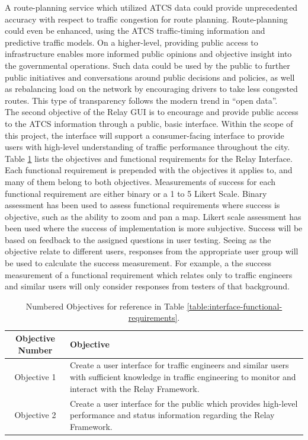 \documentclass{article}
\begin{document}
A route-planning service which utilized ATCS data could provide unprecedented accuracy with respect to traffic congestion for route planning.
Route-planning could even be enhanced, using the ATCS traffic-timing information and predictive traffic models.
On a higher-level, providing public access to infrastructure enables more informed public opinions and objective insight into the governmental operations.
Such data could be used by the public to further public initiatives and conversations around public decisions and policies, as well as rebalancing load on the network by encouraging drivers to take less congested routes.
This type of transparency follows the modern trend in ``open data''.\\

The second objective of the Relay GUI is to encourage and provide public access to the ATCS information through a public, basic interface.
Within the scope of this project, the interface will support a consumer-facing interface to provide users with high-level understanding of traffic performance throughout the city.\\

Table \ref{table:interface-objectives} lists the objectives and functional requirements for the Relay Interface.
Each functional requirement is prepended with the objectives it applies to, and many of them belong to both objectives.
Measurements of success for each functional requirement are either binary or a 1 to 5 Likert Scale.
Binary assessment has been used to assess functional requirements where success is objective, such as the ability to zoom and pan a map.
Likert scale assessment has been used where the success of implementation is more subjective.
Success will be based on feedback to the assigned questions in user testing.
Seeing as the objective relate to different users, responses from the appropriate user group will be used to calculate the success measurement.
For example, a the success measurement of a functional requirement which relates only to traffic engineers and similar users will only consider responses from testers of that background. \\

\newpage
\begin{table}[htbp!]
\begin{centering}
\begin{tabular}{|c|p{8cm}|}
\hline
\textbf{Objective Number} & \textbf{Objective} \\ \hline
Objective 1 & Create a user interface for traffic engineers and similar users with sufficient knowledge in traffic engineering to monitor and interact with the Relay Framework. \\ \hline
Objective 2 & Create a user interface for the public which provides high-level performance and status information regarding the Relay Framework. \\ \hline
\end{tabular}
\caption{Numbered Objectives for reference in Table \ref{table:interface-functional-requirements}.}
\label{table:interface-objectives}
\end{centering}
\end{table}
\end{document}
